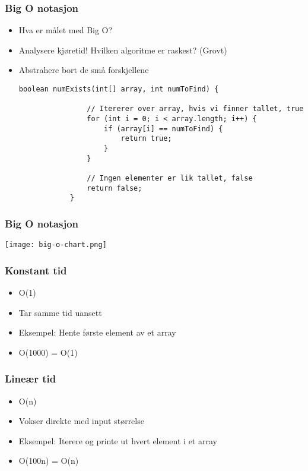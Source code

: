 \documentclass[norsk]{beamer}
\begin{document}
    \begin{frame}[fragile]
        \frametitle{Big O notasjon}
        \begin{itemize}
            \item Hva er målet med Big O?
            \pause
        \item Analysere kjøretid! Hvilken algoritme er raskest? (Grovt)
        \pause
        \item Abstrahere bort de små forskjellene
        \pause
        \begin{lstlisting}[basicstyle=\scriptsize]
            boolean numExists(int[] array, int numToFind) {

                // Itererer over array, hvis vi finner tallet, true
                for (int i = 0; i < array.length; i++) {
                    if (array[i] == numToFind) {
                        return true;
                    }
                }

                // Ingen elementer er lik tallet, false
                return false;
            }
		\end{lstlisting}
        \end{itemize}

    \end{frame}

    \begin{frame}
        \frametitle{Big O notasjon}
        \texttt{[image: big-o-chart.png]}
    \end{frame}

    \begin{frame}
        \frametitle{Konstant tid}
        \begin{itemize}
            \item O(1)
            \item Tar samme tid uansett
            \item Eksempel: Hente første element av et array
            \item O(1000) = O(1)
        \end{itemize}
    \end{frame}

    \begin{frame}
        \frametitle{Lineær tid}

        \begin{itemize}
            \item O(n)
            \item Vokser direkte med input størrelse
            \item Eksempel: Iterere og printe ut hvert element i et array
            \item O(100n) = O(n)
        \end{itemize}

    \end{frame}
\end{document}
